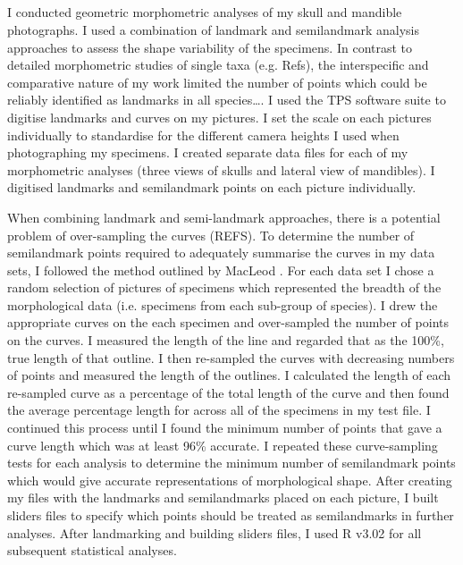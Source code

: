 \subsection{}

I conducted geometric morphometric analyses of my skull and mandible photographs. I used a combination of landmark and semilandmark analysis approaches to assess the shape variability of the specimens. In contrast to detailed morphometric studies of single taxa (e.g. Refs), the interspecific and comparative nature of my work limited the number of points which could be reliably identified as landmarks in all species….
I used the TPS software suite \citep{Rohlf2013} to digitise landmarks and curves on my pictures. I set the scale on each pictures individually to standardise for the different camera heights I used when photographing my specimens. I created separate data files for each of my morphometric analyses (three views of skulls and lateral view of mandibles). I digitised landmarks and semilandmark points on each picture individually.

When combining landmark and semi-landmark approaches, there is a potential problem of over-sampling the curves (REFS). To determine the number of semilandmark points required to adequately summarise the curves in my data sets,  I followed the method outlined by MacLeod \citeyearpar{MacLeod2012}. For each data set I chose a random selection of pictures of specimens which represented the breadth of the morphological data (i.e. specimens from each sub-group of species).  I drew the appropriate curves on the each specimen and over-sampled the number of points on the curves. I measured the length of the line and regarded that as the 100\%, true length of that outline. I then re-sampled the curves with decreasing numbers of points and measured the length of the outlines. I calculated the length of each re-sampled curve as a percentage of the total length of the curve and then found the average percentage length for across all of the specimens in my test file. I continued this process until I found the minimum number of points that gave a curve length which was at least 96\% accurate.  I repeated these curve-sampling tests for each analysis to determine the minimum number of semilandmark points which would give accurate representations of morphological shape.
After creating my files with the landmarks and semilandmarks placed on each picture, I built sliders files \citep{Zelditch2012} to specify which points should be treated as semilandmarks in further analyses. After landmarking and building sliders files, I used R v3.02 \citep[R Development Core][]{Team2013} for all subsequent statistical analyses.

